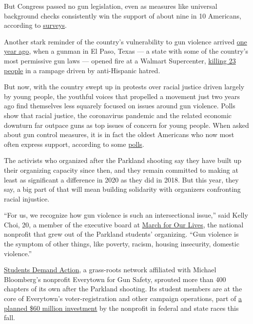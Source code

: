 But Congress passed no gun legislation, even as measures like universal
background checks consistently win the support of about nine in 10
Americans, according to
\href{http://maristpoll.marist.edu/npr-pbs-newshour-marist-poll-results-and-analysis-4/\#sthash.d89KlpFU.5oyynxDB.dpbs}{surveys}.

Another stark reminder of the country's vulnerability to gun violence
arrived
\href{https://www.nytimes.com/2019/08/03/us/el-paso-shooting.html}{one
year ago}, when a gunman in El Paso, Texas --- a state with some of the
country's most permissive gun laws --- opened fire at a Walmart
Supercenter,
\href{https://www.nytimes.com/2019/08/03/us/el-paso-shooting.html}{killing
23 people} in a rampage driven by anti-Hispanic hatred.

But now, with the country swept up in protests over racial justice
driven largely by young people, the youthful voices that propelled a
movement just two years ago find themselves less squarely focused on
issues around gun violence. Polls show that racial justice, the
coronavirus pandemic and the related economic downturn far outpace guns
as top issues of concern for young people. When asked about gun control
measures, it is in fact the oldest Americans who now most often express
support, according to some
\href{https://poll.qu.edu/national/release-detail?ReleaseID=3639}{polls}.

The activists who organized after the Parkland shooting say they have
built up their organizing capacity since then, and they remain committed
to making at least as significant a difference in 2020 as they did in
2018. But this year, they say, a big part of that will mean building
solidarity with organizers confronting racial injustice.

``For us, we recognize how gun violence is such an intersectional
issue,'' said Kelly Choi, 20, a member of the executive board at
\href{https://marchforourlives.com/}{March for Our Lives}, the national
nonprofit that grew out of the Parkland students' organizing. ``Gun
violence is the symptom of other things, like poverty, racism, housing
insecurity, domestic violence.''

\href{https://studentsdemandaction.org/}{Students Demand Action}, a
grass-roots network affiliated with Michael Bloomberg's nonprofit
Everytown for Gun Safety, sprouted more than 400 chapters of its own
after the Parkland shooting. Its student members are at the core of
Everytown's voter-registration and other campaign operations, part of
\href{https://www.nytimes.com/2020/07/23/us/politics/bloomberg-guns.html}{a
planned \$60 million investment} by the nonprofit in federal and state
races this fall.

